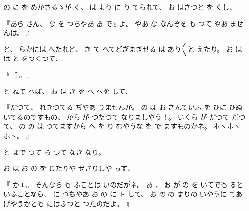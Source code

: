 %
の
に
を
めかさるゝが
く、
%
は
より
に
り
てられて、
%
お
はさつと
を
くし、

%
『あら
さん、
%
な
を
つちやあ
あ
ですよ。
%
やあ
な
なんぞを
も
つて
やあ
ませんは。
』

%
と、
%
らかには
へたれど、
%
き
て
へてどぎまぎせる
は
あり〳〵と
えたり。
%
お
は
は
と
をつくつて、

%
『
？。
』

%
と
ねて
へば、
%
お
は
き
を
へ
へを
して、

%
『だつて、
%
れきつてる
ぢやあ
りませんか。
%
の
は
お
さんていふ
を
ひに
ひぬいてるのですもの、
%
から
が
つたつて
なりましやう！。
%
いくら
が
だつて
だつて、
%
の
の
は
つてますから
へ
を
り
むやうな
を
で
ますものかネ。
%
ホヽホヽホヽ。
』

%
と
まで
つて
ら
つて
なき
なり。

%
お
は
お
の
を
じたりや
ぜざりしや
らず、

%
『
かエ。
%
そんなら
も
ふことは
いのだがネ。
%
あ
、
%
お
が
の
を
いてでも
るといふことなら、
%
に
つちやあ
お
の
に
ト
して、
%
お
の
の
まりの
いやうに
てあげやうかとも
にはふつと
つたのだよ。
』


